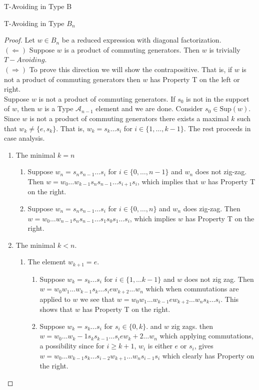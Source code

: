 \documentclass[11pt]{amsart}
\theoremstyle{definition}
\numberwithin{equation}{section}
\newcommand{\A}{\mathcal{A}}
\renewcommand{\(}{\left(}
\renewcommand{\)}{\right)}
\newcommand{\Sup}{\textrm{Sup}}
\begin{document}
\begin{section}{T-Avoiding in Type B}
\begin{subsection}{T-Avoiding in Type $B_n$}
\begin{proof}
	Let $w \in B_n$ be a reduced expression with diagonal factorization.\\
	$(\Leftarrow)$ Suppose $w$ is a product of commuting generators. Then $w$ is trivially $T-Avoiding$.\\
	$(\Rightarrow)$ To prove this direction we will show the contrapositive. That is, if $w$ is not a product of commuting generators then $w$ has Property T on the left or right.\\
	Suppose $w$ is not a product of commuting generators. If $s_0$ is not in the support of $w$, then $w$ is a Type $\A_{n-1}$ element and we are done. Consider $s_0 \in \Sup(w)$. Since $w$ is not a product of commuting generators there exists a maximal $k$ such that $w_k \neq \{e, s_k\}$. That is, $w_k=s_k \ldots s_i$ for $i \in \{1, \ldots ,k-1\}$. The rest proceeds in case analysis.
	\begin{enumerate}
	\item The minimal $k=n$
	\begin{enumerate}
	\item Suppose $w_n=s_ns_{n-1} \ldots s_i$ for $i \in \{0, \ldots ,n-1\}$ and $w_n$ does not zig-zag. Then $w=w_0 \ldots w_{k-1} s_n s_{n-1} \ldots s_{i+1} s_i$, which implies that $w$ has Property T on the right.
	\item Suppose $w_n=s_n s_{n-1} \ldots s_i$ for $i \in \{0, \ldots ,n\}$ and $w_n$ does zig-zag. Then $w=w_0 \ldots w_{n-1} s_n s_{n-1} \ldots s_1 s_0 s_1 \ldots s_i$, which implies $w$ has Property T on the right.
	\end{enumerate}
	\item The minimal $k < n$.
	\begin{enumerate}
	\item The element $w_{k+1}=e$.
	\begin{enumerate}
	\item Suppose $w_k =s_k \ldots s_i$ for $i \in \{1, \ldots k-1\}$ and $w$ does not zig zag. Then $w=w_0 w_1 \ldots w_{k-1} s_k \ldots s_i e w_{k+2} \ldots w_n$ which when commutations are applied to $w$ we see that $w=w_0 w_1 \ldots w_{k-1} e w_{k+2} \ldots w_n s_k \ldots s_i$. This shows that $w$ has Property T on the right.
	\item Suppose $w_k=s_k \ldots s_i$ for $s_i \in \{0, k\}$. and $w$ zig zags. then $w=w_0 \ldots w_k-1 s_k s_{k-1} \ldots s_i e w_k+2 \ldots w_n$ which applying commutations, a possibility since for $i \geq k+1$, $w_i$ is either $e$ or $s_i$, gives $w=w_0 \ldots w_{k-1} s_k \ldots s_{i-2} w_{k+1} \ldots w_n s_{i-1} s_i$ which clearly has Property on the right.

\end{enumerate}
\end{enumerate}
\end{enumerate}
\end{proof}
\end{subsection}
\end{section}
\end{document}
